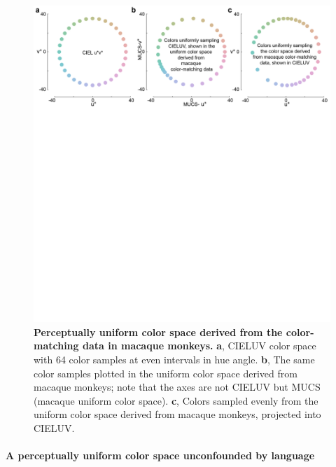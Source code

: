 \begin{figure}
    \begin{fullwidth}
    \centering
      \includegraphics[width=\textwidth+4cm,trim={0 15cm 0 0},clip]{../Figures/flat/F6_ColSpace_2}
           \caption{\textbf{Perceptually uniform color space derived from the color-matching data in macaque monkeys.} 
			\textbf{a}, CIELUV color space with 64 color samples at even intervals in hue angle. 
			\textbf{b}, The same color samples plotted in the uniform color space derived from macaque monkeys; note that the axes are not CIELUV but MUCS (macaque uniform color space). 
			\textbf{c}, Colors sampled evenly from the uniform color space derived from macaque monkeys, projected into CIELUV.}
		\label{fig:MACBEHcolorspace}
    \end{fullwidth}
\end{figure}


\paragraph{A perceptually uniform color space unconfounded by language}

